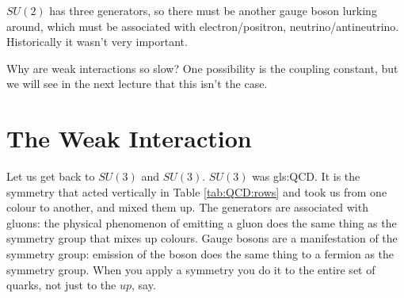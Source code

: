 \documentclass[]{article}
\begin{document}
\begin{figure}[H]
\begin{subfigure}[t]{0.45\textwidth}
	\end{subfigure}
\end{figure}

$SU(2)$ has three generators, so there must be another gauge boson lurking around, which must be associated with electron/positron, neutrino/antineutrino. Historically it wasn't very important.

Why are weak interactions so slow? One possibility is the coupling constant, but we will see in the next lecture that this isn't the case.

\section{The Weak Interaction}

Let us get back to $SU(3)$ and $SU(3)$. $SU(3)$ was \gls{gls:QCD}. It is the symmetry that acted vertically in Table \ref{tab:QCD:rows} and took us from one colour to another, and mixed them up. The generators are associated with gluons: the physical phenomenon of emitting a gluon does the same thing as the symmetry group that mixes up colours. Gauge bosons are a manifestation of the symmetry group: emission of the boson does the same thing to a fermion as the symmetry group. When you apply a symmetry you do it to the entire set of quarks, not just to the $up$, say.
\end{document}
